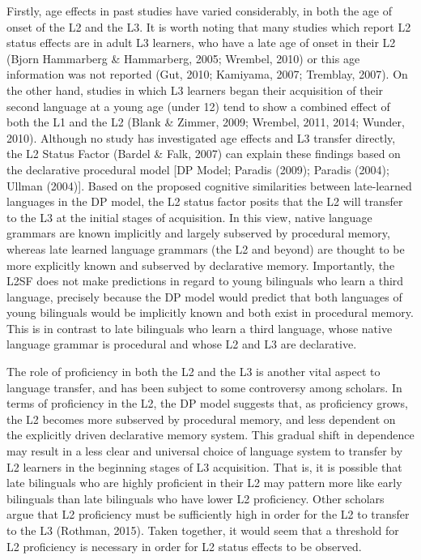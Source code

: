 \documentclass[
  english,
  man]{apa6}
\begin{document}
Firstly, age effects in past studies have varied considerably, in both the age of onset of the L2 and the L3.
It is worth noting that many studies which report L2 status effects are in adult L3 learners, who have a late age of onset in their L2 (Bjorn Hammarberg \& Hammarberg, 2005; Wrembel, 2010) or this age information was not reported (Gut, 2010; Kamiyama, 2007; Tremblay, 2007).
On the other hand, studies in which L3 learners began their acquisition of their second language at a young age (under 12) tend to show a combined effect of both the L1 and the L2 (Blank \& Zimmer, 2009; Wrembel, 2011, 2014; Wunder, 2010).
Although no study has investigated age effects and L3 transfer directly, the L2 Status Factor (Bardel \& Falk, 2007) can explain these findings based on the declarative procedural model {[}DP Model; Paradis (2009); Paradis (2004); Ullman (2004){]}.
Based on the proposed cognitive similarities between late-learned languages in the DP model, the L2 status factor posits that the L2 will transfer to the L3 at the initial stages of acquisition.
In this view, native language grammars are known implicitly and largely subserved by procedural memory, whereas late learned language grammars (the L2 and beyond) are thought to be more explicitly known and subserved by declarative memory.
Importantly, the L2SF does not make predictions in regard to young bilinguals who learn a third language, precisely because the DP model would predict that both languages of young bilinguals would be implicitly known and both exist in procedural memory.
This is in contrast to late bilinguals who learn a third language, whose native language grammar is procedural and whose L2 and L3 are declarative.

The role of proficiency in both the L2 and the L3 is another vital aspect to language transfer, and has been subject to some controversy among scholars.
In terms of proficiency in the L2, the DP model suggests that, as proficiency grows, the L2 becomes more subserved by procedural memory, and less dependent on the explicitly driven declarative memory system.
This gradual shift in dependence may result in a less clear and universal choice of language system to transfer by L2 learners in the beginning stages of L3 acquisition.
That is, it is possible that late bilinguals who are highly proficient in their L2 may pattern more like early bilinguals than late bilinguals who have lower L2 proficiency.
Other scholars argue that L2 proficiency must be sufficiently high in order for the L2 to transfer to the L3 (Rothman, 2015).
Taken together, it would seem that a threshold for L2 proficiency is necessary in order for L2 status effects to be observed.
\end{document}

